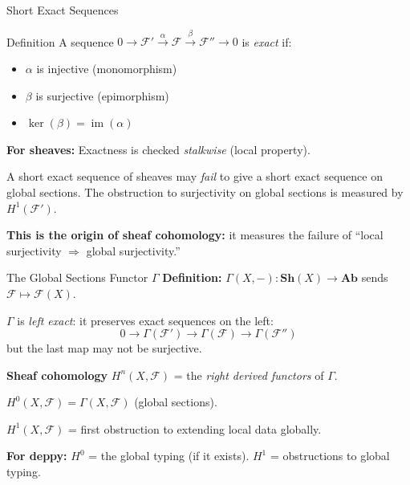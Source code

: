 \documentclass[aspectratio=169,10pt]{beamer}
\newcommand{\Fscr}{\mathcal{F}}
\newcommand{\im}{\operatorname{im}}
\newcommand{\Ab}{\mathbf{Ab}}
\begin{document}
\begin{frame}{Short Exact Sequences}
\begin{block}{Definition}
A sequence $0 \to \Fscr' \xrightarrow{\alpha} \Fscr \xrightarrow{\beta} \Fscr'' \to 0$ is \emph{exact} if:
\begin{itemize}
  \item $\alpha$ is injective (monomorphism)
  \item $\beta$ is surjective (epimorphism)
  \item $\ker(\beta) = \im(\alpha)$
\end{itemize}
\end{block}

\textbf{For sheaves:} Exactness is checked \emph{stalkwise} (local property).

A short exact sequence of sheaves may \emph{fail} to give a short exact sequence on global sections. The obstruction to surjectivity on global sections is measured by $H^1(\Fscr')$.

\vspace{0.3em}
\textbf{This is the origin of sheaf cohomology:} it measures the failure of ``local surjectivity $\Rightarrow$ global surjectivity.''
\end{frame}

\begin{frame}{The Global Sections Functor $\Gamma$}
\textbf{Definition:} $\Gamma(X, -) : \mathbf{Sh}(X) \to \Ab$ sends $\Fscr \mapsto \Fscr(X)$.

$\Gamma$ is \emph{left exact}: it preserves exact sequences on the left:
\[
0 \to \Gamma(\Fscr') \to \Gamma(\Fscr) \to \Gamma(\Fscr'')
\]
but the last map may not be surjective.

\vspace{0.3em}
\textbf{Sheaf cohomology} $H^n(X, \Fscr)$ = the \emph{right derived functors} of $\Gamma$.

$H^0(X, \Fscr) = \Gamma(X, \Fscr)$ (global sections).

$H^1(X, \Fscr)$ = first obstruction to extending local data globally.

\vspace{0.3em}
\textbf{For deppy:} $H^0$ = the global typing (if it exists). $H^1$ = obstructions to global typing.
\end{frame}
\end{document}
